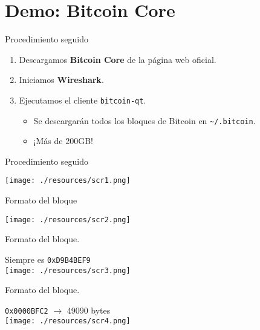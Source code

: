 \documentclass[10pt, xcolor=table]{beamer}
\begin{document}
\section{Demo: Bitcoin Core}

\begin{frame}{Procedimiento seguido}
\begin{enumerate}
	\item Descargamos \textbf{Bitcoin Core} de la página web oficial.
	\item Iniciamos \textbf{Wireshark}.
	\item Ejecutamos el cliente \texttt{bitcoin-qt}.
	\begin{itemize}
		\item Se descargarán todos los bloques de Bitcoin en \texttt{\textasciitilde/.bitcoin}.
		\item ¡Más de 200GB!
\end{itemize}
\end{enumerate}
\end{frame}

\begin{frame}{Procedimiento seguido}
\begin{center}
	\texttt{[image: ./resources/scr1.png]}
\end{center}	
\end{frame}

\begin{frame}{Formato del bloque}
\begin{center}
	\texttt{[image: ./resources/scr2.png]}
\end{center}	
\end{frame}

\begin{frame}{Formato del bloque. }
\begin{center}
Siempre es \texttt{0xD9B4BEF9}\\
\hspace{1cm}
	\texttt{[image: ./resources/scr3.png]}
\end{center}	
\end{frame}

\begin{frame}{Formato del bloque. }
\begin{center}
\texttt{0x0000BFC2} $\longrightarrow$ 49090 bytes\\
\hspace{1cm}
	\texttt{[image: ./resources/scr4.png]}
\end{center}	
\end{frame}
\end{document}
